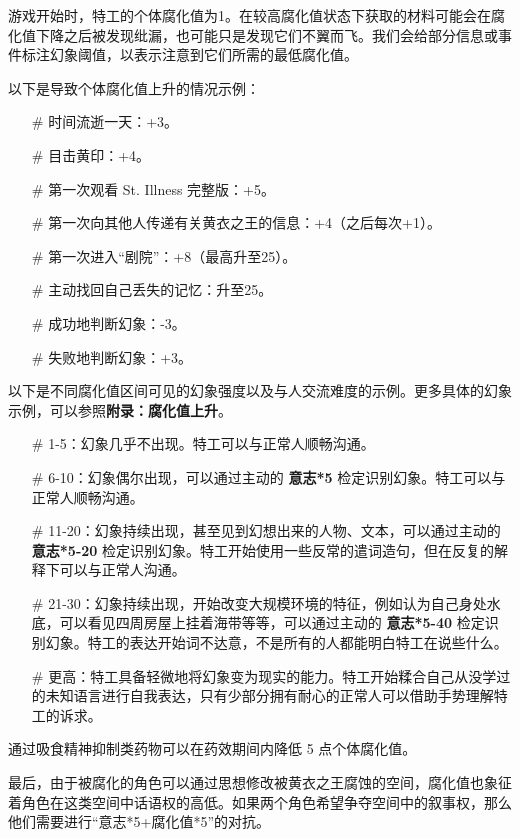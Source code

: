 游戏开始时，特工的个体腐化值为1。在较高腐化值状态下获取的材料可能会在腐化值下降之后被发现纰漏，也可能只是发现它们不翼而飞。我们会给部分信息或事件标注幻象阈值，以表示注意到它们所需的最低腐化值。

以下是导致个体腐化值上升的情况示例：

\begin{itemize}
    \item[\#] 时间流逝一天：+3。
    \item[\#] 目击黄印：+4。
    \item[\#] 第一次观看 St. Illness 完整版：+5。
    \item[\#] 第一次向其他人传递有关黄衣之王的信息：+4（之后每次+1）。
    \item[\#] 第一次进入“剧院”：+8（最高升至25）。
    \item[\#] 主动找回自己丢失的记忆：升至25。
    \item[\#] 成功地判断幻象：-3。
    \item[\#] 失败地判断幻象：+3。
\end{itemize}

以下是不同腐化值区间可见的幻象强度以及与人交流难度的示例。更多具体的幻象示例，可以参照\textbf{附录：腐化值上升}。

\begin{itemize}
    \item[\#] 1-5：幻象几乎不出现。特工可以与正常人顺畅沟通。
    \item[\#] 6-10：幻象偶尔出现，可以通过主动的 \textbf{意志*5} 检定识别幻象。特工可以与正常人顺畅沟通。
    \item[\#] 11-20：幻象持续出现，甚至见到幻想出来的人物、文本，可以通过主动的 \textbf{意志*5-20} 检定识别幻象。特工开始使用一些反常的遣词造句，但在反复的解释下可以与正常人沟通。
    \item[\#] 21-30：幻象持续出现，开始改变大规模环境的特征，例如认为自己身处水底，可以看见四周房屋上挂着海带等等，可以通过主动的 \textbf{意志*5-40} 检定识别幻象。特工的表达开始词不达意，不是所有的人都能明白特工在说些什么。
    \item[\#] 更高：特工具备轻微地将幻象变为现实的能力。特工开始糅合自己从没学过的未知语言进行自我表达，只有少部分拥有耐心的正常人可以借助手势理解特工的诉求。
\end{itemize}

通过吸食精神抑制类药物可以在药效期间内降低 5 点个体腐化值。

最后，由于被腐化的角色可以通过思想修改被黄衣之王腐蚀的空间，腐化值也象征着角色在这类空间中话语权的高低。如果两个角色希望争夺空间中的叙事权，那么他们需要进行“意志*5+腐化值*5”的对抗。

